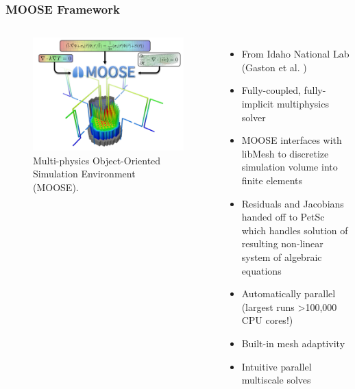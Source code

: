 \begin{frame}
  \frametitle{MOOSE Framework}
  \begin{columns}
    \column[t]{6cm}
  \begin{figure}[t]
       \includegraphics[width=\linewidth]{./images/moose.png}
            \caption{Multi-physics Object-Oriented Simulation Environment (MOOSE).}
  \end{figure}
	\column[t]{6cm}
               \begin{itemize}
               \item From Idaho National Lab (Gaston et al.  \cite{gaston_parallel_2009})
	       \item Fully-coupled, fully-implicit multiphysics solver
               \item MOOSE interfaces with libMesh to discretize simulation volume into finite elements
               \item Residuals and Jacobians handed off to PetSc which handles solution of resulting non-linear system of algebraic equations
	       \item Automatically parallel (largest runs \textgreater 100,000 CPU cores!)
	       \item Built-in mesh adaptivity
	       \item Intuitive parallel multiscale solves
               \end{itemize}

  \end{columns}
\end{frame}

